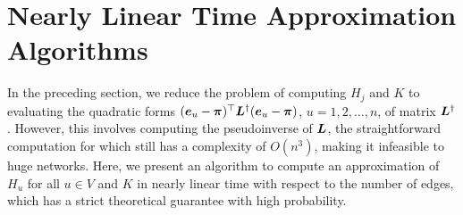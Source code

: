 \documentclass[journal]{IEEEtran}
\begin{document}
\section{Nearly Linear Time Approximation Algorithms}

In the preceding section, we reduce the problem of computing  \(H_j\) and \(K\) to evaluating the quadratic forms \((\boldsymbol{e}_u - \boldsymbol{\pi})^{\top} \boldsymbol{L}^{\dagger} (\boldsymbol{e}_u- \boldsymbol{\pi})\), \(u=1,2,\ldots, n\), of matrix  \(\boldsymbol{L}^{\dagger}\).  However,  this involves computing the pseudoinverse of \(\boldsymbol{L}\), the  straightforward computation for which still has a complexity of \(O(n^3)\), making it infeasible to huge networks. Here, we present an algorithm to compute an approximation of \(H_u\) for all  \(u \in V\) and \(K\)  in nearly linear time with respect to the number of edges,  which has a strict theoretical guarantee with  high probability.

\end{document}
